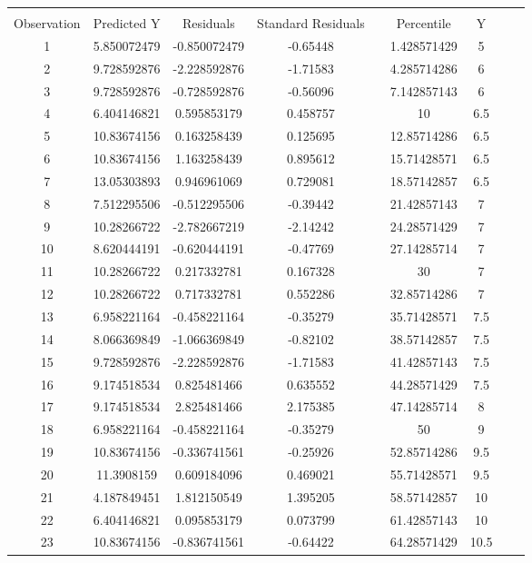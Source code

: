 \begin{center}
{\begin{longtable}{ccccccccc}
& & & & & & & & \\
Observation & Predicted Y & Residuals & Standard Residuals & & Percentile & Y & & \\
1 & 5.850072479 & -0.850072479 & -0.65448 & & 1.428571429 & 5 & & \\
2 & 9.728592876 & -2.228592876 & -1.71583 & & 4.285714286 & 6 & & \\
3 & 9.728592876 & -0.728592876 & -0.56096 & & 7.142857143 & 6 & & \\
4 & 6.404146821 & 0.595853179 & 0.458757 & & 10 & 6.5 & & \\
5 & 10.83674156 & 0.163258439 & 0.125695 & & 12.85714286 & 6.5 & & \\
6 & 10.83674156 & 1.163258439 & 0.895612 & & 15.71428571 & 6.5 & & \\
7 & 13.05303893 & 0.946961069 & 0.729081 & & 18.57142857 & 6.5 & & \\
8 & 7.512295506 & -0.512295506 & -0.39442 & & 21.42857143 & 7 & & \\
9 & 10.28266722 & -2.782667219 & -2.14242 & & 24.28571429 & 7 & & \\
10 & 8.620444191 & -0.620444191 & -0.47769 & & 27.14285714 & 7 & & \\
11 & 10.28266722 & 0.217332781 & 0.167328 & & 30 & 7 & & \\
12 & 10.28266722 & 0.717332781 & 0.552286 & & 32.85714286 & 7 & & \\
13 & 6.958221164 & -0.458221164 & -0.35279 & & 35.71428571 & 7.5 & & \\
14 & 8.066369849 & -1.066369849 & -0.82102 & & 38.57142857 & 7.5 & & \\
15 & 9.728592876 & -2.228592876 & -1.71583 & & 41.42857143 & 7.5 & & \\
16 & 9.174518534 & 0.825481466 & 0.635552 & & 44.28571429 & 7.5 & & \\
17 & 9.174518534 & 2.825481466 & 2.175385 & & 47.14285714 & 8 & & \\
18 & 6.958221164 & -0.458221164 & -0.35279 & & 50 & 9 & & \\
19 & 10.83674156 & -0.336741561 & -0.25926 & & 52.85714286 & 9.5 & & \\
20 & 11.3908159 & 0.609184096 & 0.469021 & & 55.71428571 & 9.5 & & \\
21 & 4.187849451 & 1.812150549 & 1.395205 & & 58.57142857 & 10 & & \\
22 & 6.404146821 & 0.095853179 & 0.073799 & & 61.42857143 & 10 & & \\
23 & 10.83674156 & -0.836741561 & -0.64422 & & 64.28571429 & 10.5 & & \\

\end{longtable}}
\end{center}
